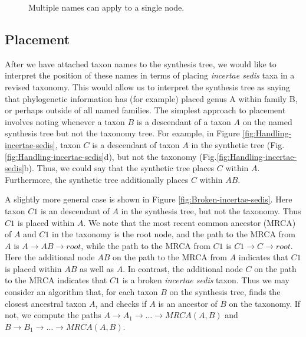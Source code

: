 \documentclass[english]{article}
\begin{document}
\begin{figure}
\hfill{}
\hfill{}
\caption{\label{fig:Multiple-names-can}Multiple names can apply to a single node.}
\end{figure}


\subsection{Placement}\label{subsec:Placement}

After we have attached taxon names to the synthesis tree, we would
like to interpret the position of these names in terms of placing
\emph{incertae sedis }taxa in a revised taxonomy.
This would allow us
to interpret the synthesis tree as saying that phylogenetic
information has (for example) placed genus A within family B, or
perhaps outside of all named families.
The simplest approach to
placement involves noting whenever a taxon $B$ is a descendant of a
taxon $A$ on the named synthesis tree but not the taxonomy tree.
For
example, in Figure \ref{fig:Handling-incertae-sedis}, taxon $C$ is a
descendant of taxon $A$ in the synthetic tree 
(Fig.\ref{fig:Handling-incertae-sedis}d), but not the taxonomy 
(Fig.\ref{fig:Handling-incertae-sedis}b).
Thus, we could say that the synthetic tree places
$C$ within $A$. Furthermore, the synthetic tree additionally places
$C$ within $AB$.

A slightly more general case is shown in 
Figure \ref{fig:Broken-incertae-sedis}.
Here taxon $C1$ is an descendant of $A$ in the
synthesis tree, but not the taxonomy.
Thus $C1$ is placed within $A$.
We note that the most recent common ancestor (MRCA) of $A$ and $C1$ in
the taxonomy is the root node, and the path to the MRCA from $A$ is
$A\to AB\to root$, while the path to the MRCA from $C1$ is $C1\to C\to
root$.
Here the additional node $AB$ on the path to the MRCA from $A$
indicates that $C1$ is placed within $AB$ as well as $A$.
In contrast,
the additional node $C$ on the path to the MRCA indicates that $C1$ is
a broken \emph{incertae sedis} taxon.
Thus we may consider an
algorithm that, for each taxon $B$ on the synthesis tree, finds the
closest ancestral taxon $A$, and checks if $A$ is an ancestor of $B$
on the taxonomy.
If not, we compute the paths $A\to A_{1}\to\ldots\to
MRCA(A,B)$ and $B\to B_{1}\to\ldots\to MRCA(A,B)$.
\end{document}
